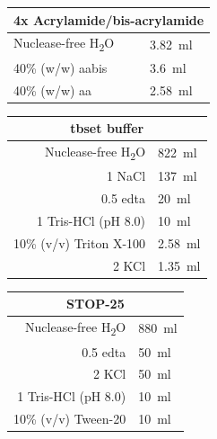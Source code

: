 \begin{appendix}
\begin{multicols}{2}

\begin{center}
\begin{tabular}{m{5cm}|l}
	\multicolumn{2}{c}{4x Acrylamide/bis-acrylamide } \\
	\hline
	Nuclease-free H\textsubscript{2}O & \SI{3.82}{\ml} \\
	40\% (w/w) \Acrfull{aabis} & \SI{3.6}{\ml} \\
	40\% (w/w) \Acrfull{aa} & \SI{2.58}{\ml} \\
\end{tabular}
\end{center}
\medskip


\begin{center}
\begin{tabular}{r|l}
	\multicolumn{2}{c}{\Acrfull{tbset} buffer} \\
	\hline
	Nuclease-free H\textsubscript{2}O & \SI{822}{\ml} \\
	\SI{1}{\molar} NaCl & \SI{137}{\ml} \\
	\SI{0.5}{\molar} \acrshort{edta} & \SI{20}{\ml} \\
	\SI{1}{\molar} Tris-HCl (pH 8.0) & \SI{10}{\ml} \\
	10\% (v/v) Triton X-100 & \SI{2.58}{\ml} \\
	\SI{2}{\molar} KCl & \SI{1.35}{\ml} \\
\end{tabular}
\end{center}
\medskip


\begin{center}
\begin{tabular}{r|l}
	\multicolumn{2}{c}{STOP-25} \\
	\hline
	Nuclease-free H\textsubscript{2}O & \SI{880}{\ml} \\
	\SI{0.5}{\molar} \acrshort{edta} & \SI{50}{\ml} \\
	\SI{2}{\molar} KCl & \SI{50}{\ml} \\
	\SI{1}{\molar} Tris-HCl (pH 8.0) & \SI{10}{\ml} \\
	10\% (v/v) Tween-20 & \SI{10}{\ml} \\
\end{tabular}
\end{center}
\medskip


\end{multicols}
\end{appendix}
